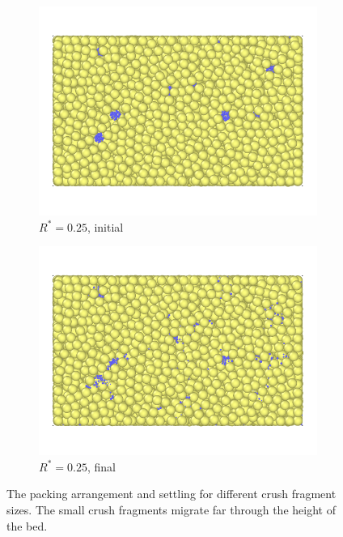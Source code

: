 \begin{figure}[!ht]
	\begin{subfigure}[b]{\imagewidth}
		\centering
		\includegraphics[width=\textwidth]{chapters/figures/crush-fragments/0.25-1.png}
		\caption{$R^* = 0.25$, initial}
	\end{subfigure}
	\begin{subfigure}[b]{\imagewidth}
		\centering
		\includegraphics[width=\textwidth]{chapters/figures/crush-fragments/0.25-2.png}
		\caption{$R^* = 0.25$, final}
	\end{subfigure}
	\caption{The packing arrangement and settling for different crush fragment sizes. The small crush fragments migrate far through the height of the bed.}
\label{fig:crush-settling-pictures-1}
\end{figure}

